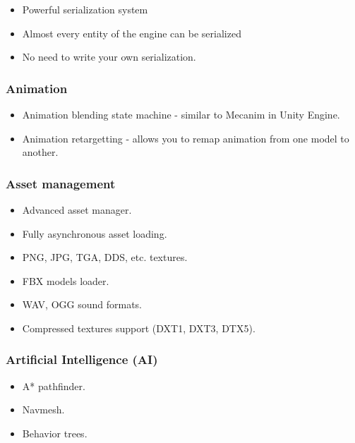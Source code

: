 \documentclass[
]{book}
\providecommand{\tightlist}{%
  \setlength{\itemsep}{0pt}\setlength{\parskip}{0pt}}
\theoremstyle{definition}
\theoremstyle{definition}
\theoremstyle{definition}
\theoremstyle{definition}
\theoremstyle{remark}
\begin{document}
\begin{itemize}
\tightlist
\item
  Powerful serialization system
\item
  Almost every entity of the engine can be serialized
\item
  No need to write your own serialization.
\end{itemize}

\subsubsection{Animation}\label{animation}

\begin{itemize}
\tightlist
\item
  Animation blending state machine - similar to Mecanim in Unity Engine.
\item
  Animation retargetting - allows you to remap animation from one model to another.
\end{itemize}

\subsubsection{Asset management}\label{asset-management}

\begin{itemize}
\tightlist
\item
  Advanced asset manager.
\item
  Fully asynchronous asset loading.
\item
  PNG, JPG, TGA, DDS, etc. textures.
\item
  FBX models loader.
\item
  WAV, OGG sound formats.
\item
  Compressed textures support (DXT1, DXT3, DTX5).
\end{itemize}

\subsubsection{Artificial Intelligence (AI)}\label{artificial-intelligence-ai}

\begin{itemize}
\tightlist
\item
  A* pathfinder.
\item
  Navmesh.
\item
  Behavior trees.
\end{itemize}
\end{document}
